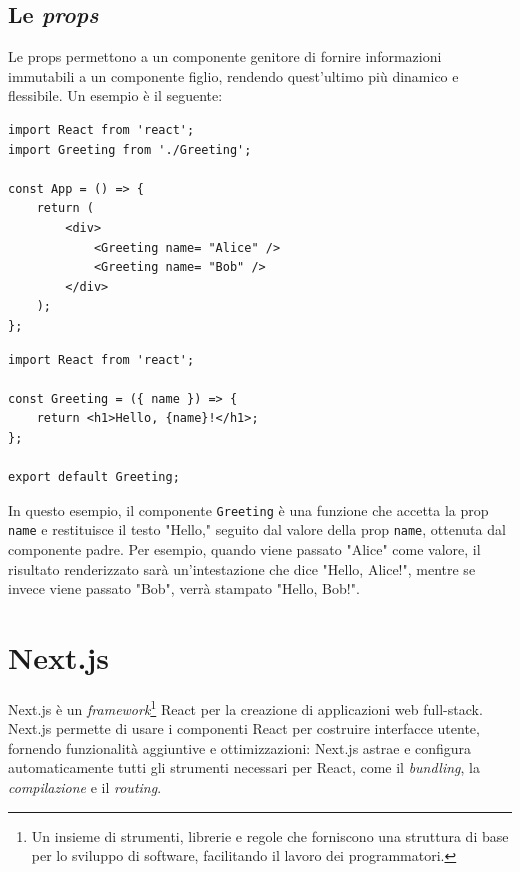 \documentclass[target=bach,aauheader=,style=]{thud}
\begin{document}
\subsection{Le \textit{props}}
Le props permettono a un componente genitore di fornire informazioni immutabili a un componente figlio, rendendo quest'ultimo più dinamico e flessibile. Un esempio è il seguente:

\begin{minipage}[t]{0.45\textwidth}
    \begin{lstlisting}[caption=Componente genitore]
import React from 'react';
import Greeting from './Greeting';

const App = () => {
    return (
        <div>
            <Greeting name= "Alice" />
            <Greeting name= "Bob" />
        </div>
    );
};  
    \end{lstlisting}
\end{minipage}
\hfill
\begin{minipage}[t]{0.45\textwidth}
    \begin{lstlisting}[caption=Componente figlio]
import React from 'react';

const Greeting = ({ name }) => {
    return <h1>Hello, {name}!</h1>;
};

export default Greeting;
    \end{lstlisting}
\end{minipage}

\noindent In questo esempio, il componente \texttt{Greeting} è una funzione che accetta la prop \texttt{name} e restituisce il testo  "Hello," seguito dal valore della prop \texttt{name}, ottenuta dal componente padre. Per esempio, quando viene passato "Alice" come valore, il risultato renderizzato sarà un'intestazione che dice "Hello, Alice!", mentre se invece viene passato "Bob", verrà stampato "Hello, Bob!".

\section{Next.js}
Next.js \cite{nextjsdocs2024} è un \textit{framework}\footnote{Un insieme di strumenti, librerie e regole che forniscono una struttura di base per lo sviluppo di software, facilitando il lavoro dei programmatori.} React per la creazione di applicazioni web full-stack. Next.js permette di usare i componenti React per costruire interfacce utente, fornendo funzionalità aggiuntive e ottimizzazioni: Next.js astrae e configura automaticamente tutti gli strumenti necessari per React, come il \textit{bundling}, la \textit{compilazione} e il \textit{routing}.
\end{document}
